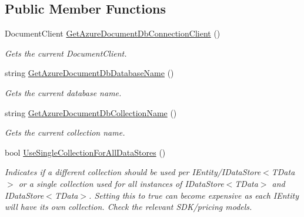 \subsection*{Public Member Functions}
\begin{DoxyCompactItemize}
\item 
Document\+Client \hyperlink{interfaceCqrs_1_1Azure_1_1DocumentDb_1_1Factories_1_1IAzureDocumentDbDataStoreConnectionStringFactory_ad5207c6dfcb6496aa9fb731b6453a1ee_ad5207c6dfcb6496aa9fb731b6453a1ee}{Get\+Azure\+Document\+Db\+Connection\+Client} ()
\begin{DoxyCompactList}\small\item\em Gets the current Document\+Client. \end{DoxyCompactList}\item 
string \hyperlink{interfaceCqrs_1_1Azure_1_1DocumentDb_1_1Factories_1_1IAzureDocumentDbDataStoreConnectionStringFactory_aa5e3d0920e86a97aef18f4f215ce4f88_aa5e3d0920e86a97aef18f4f215ce4f88}{Get\+Azure\+Document\+Db\+Database\+Name} ()
\begin{DoxyCompactList}\small\item\em Gets the current database name. \end{DoxyCompactList}\item 
string \hyperlink{interfaceCqrs_1_1Azure_1_1DocumentDb_1_1Factories_1_1IAzureDocumentDbDataStoreConnectionStringFactory_a0ad3d0046331ea62ea2415f2c0af5675_a0ad3d0046331ea62ea2415f2c0af5675}{Get\+Azure\+Document\+Db\+Collection\+Name} ()
\begin{DoxyCompactList}\small\item\em Gets the current collection name. \end{DoxyCompactList}\item 
bool \hyperlink{interfaceCqrs_1_1Azure_1_1DocumentDb_1_1Factories_1_1IAzureDocumentDbDataStoreConnectionStringFactory_ae500b0191fee202806701e4f856c43dd_ae500b0191fee202806701e4f856c43dd}{Use\+Single\+Collection\+For\+All\+Data\+Stores} ()
\begin{DoxyCompactList}\small\item\em Indicates if a different collection should be used per I\+Entity/I\+Data\+Store$<$\+T\+Data$>$ or a single collection used for all instances of I\+Data\+Store$<$\+T\+Data$>$ and I\+Data\+Store$<$\+T\+Data$>$. Setting this to true can become expensive as each I\+Entity will have it\textquotesingle{}s own collection. Check the relevant S\+D\+K/pricing models. \end{DoxyCompactList}\end{DoxyCompactItemize}


